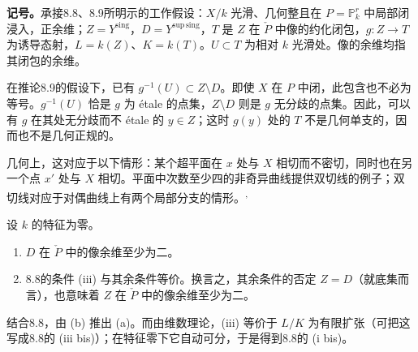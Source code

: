 \begingroup
\def\PP{\mathbb P}\def\OO{\mathcal O}\def\Ocal{\mathcal O}
\def\F{\mathcal F}\def\G{\mathcal G}\def\N{\mathcal N}
\def\PD{\check P}\def\Pdual{\check P}
\def\Ys{Y^{\mathrm{sing}}}\def\Ysing{Y^{\mathrm{sing}}}
\def\Ds{Y^{\mathrm{sup\,sing}}}\def\Ysup{Y^{\mathrm{sup\,sing}}}
\def\cod{\operatorname{codim}}\def\Sing{\operatorname{Sing}}
\def\depth{\operatorname{depth}}\def\coprof{\operatorname{coprof}}
\def\Ass{\operatorname{Ass}}\def\Supp{\operatorname{Supp}}
\def\Gr{\operatorname{Gr}}\def\Spec{\operatorname{Spec}}\def\Proj{\operatorname{Proj}}
\noindent\textbf{记号。}承接8.8、8.9所明示的工作假设：$X/k$ 光滑、几何整且在 $P=\mathbb P^r_k$ 中局部闭浸入，正余维；$Z=\Ys$，$D=\Ds$，$T$ 是 $Z$ 在 $\PD$ 中像的约化闭包，$g:Z\to T$ 为诱导态射，$L=k(Z)$、$K=k(T)$。$U\subset T$ 为相对 $k$ 光滑处。像的余维均指其闭包的余维。

在推论8.9的假设下，已有 $g^{-1}(U)\subset Z\setminus D$。即使 $X$ 在 $P$ 中闭，此包含也不必为等号。$g^{-1}(U)$ 恰是 $g$ 为 étale 的点集，$Z\setminus D$ 则是 $g$ 无分歧的点集。因此，可以有 $g$ 在其处无分歧而不 étale 的 $y\in Z$；这时 $g(y)$ 处的 $T$ 不是几何单支的，因而也不是几何正规的。

几何上，这对应于以下情形：某个超平面在 $x$ 处与 $X$ 相切而不密切，同时也在另一个点 $x'$ 处与 $X$ 相切。平面中次数至少四的非奇异曲线提供双切线的例子；双切线对应于对偶曲线上有两个局部分支的情形。\textsuperscript{,}

设 $k$ 的特征为零。
\begin{enumerate}
\renewcommand{\labelenumi}{(\alph{enumi})}
\item $D$ 在 $\PD$ 中的像余维至少为二。
\item 8.8的条件 (iii) 与其余条件等价。换言之，其余条件的否定 $Z=D$（就底集而言），也意味着 $Z$ 在 $\PD$ 中的像余维至少为二。
\end{enumerate}
结合8.8，由 (b) 推出 (a)。而由维数理论，(iii) 等价于 $L/K$ 为有限扩张（可把这写成8.8的 (iii bis)）；在特征零下它自动可分，于是得到8.8的 (i bis)。

